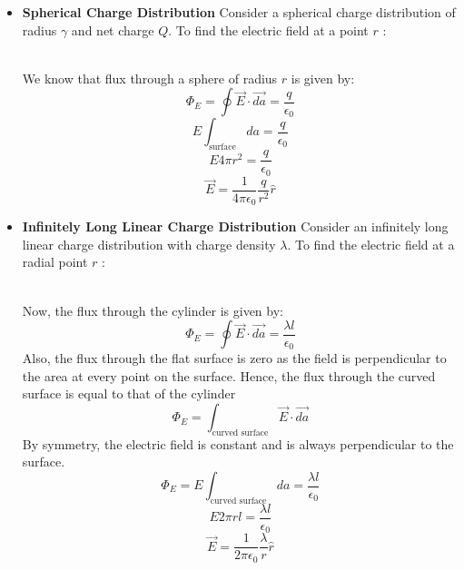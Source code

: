 \documentclass{article}
\begin{document}
\begin{itemize}

\item \textbf{Spherical Charge Distribution}
Consider a spherical charge distribution of radius $\gamma$ and net charge $Q$. 
To find the electric field at a point $r$ :\\

\\

We know that flux through a sphere of radius $r$ is given by:
\[\Phi_E = \oint \vec{E} \cdot \vec{da} = \frac{q}{\epsilon_0}\]
\[ E \int_{\text{surface}} da = \frac{q}{\epsilon_0} \]
\[ E 4 \pi r^2 = \frac{q}{\epsilon_0} \]
\[ \vec{E} = \frac{1}{4 \pi \epsilon_0} \frac{q}{r^2} \hat{r} \]

\item \textbf{Infinitely Long Linear Charge Distribution}
Consider an infinitely long linear charge distribution with charge density $\lambda$.
To find the electric field at a radial point $r$ :\\

\\

Now, the flux through the cylinder is given by:
\[\Phi_E = \oint \vec{E} \cdot \vec{da} = \frac{\lambda l}{\epsilon_0}\]
Also, the flux through the flat surface is zero as the field is perpendicular to the area at every point on the surface.
Hence, the flux through the curved surface is equal to that of the cylinder
\[ \Phi_E = \int_{\text{curved surface}} \vec{E}\cdot \vec{da} \]
By symmetry, the electric field is constant and is always perpendicular to the surface.
\[ \Phi_E = E \int_{\text{curved surface}} da = \frac{\lambda l}{\epsilon_0} \]
\[ E 2 \pi r l = \frac{\lambda l}{\epsilon_0} \]
\[ \vec{E} = \frac{1}{2 \pi \epsilon_0} \frac{\lambda}{r} \hat{r} \]


\end{itemize}
\end{document}
